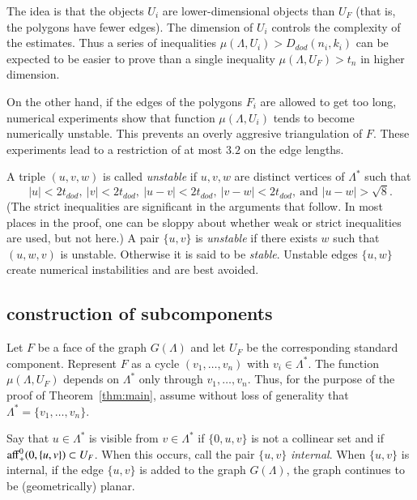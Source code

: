 The idea is that the objects $U_i$ are lower-dimensional objects
than $U_F$ (that is, the polygons  have fewer edges).
The dimension of $U_i$ controls the complexity
of the estimates.  Thus a series of inequalities $\mu(\Lambda,U_i) > D_{dod}(n_i,k_i)$
can be expected to be easier to prove than a single inequality
$\mu(\Lambda,U_F) > t_n$ in higher dimension.  

On the other hand, if the edges of the polygons $F_i$ are allowed
to get too long, numerical experiments show that function $\mu(\Lambda,U_i)$
tends to become numerically unstable.  This prevents 
an overly aggresive  triangulation of $F$.
These experiments lead
 to a restriction of at most $3.2$ on the edge lengths.

A triple $(u,v,w)$ is called {\it unstable}
if $u,v,w$ are distinct vertices of $\Lambda^*$ such
that 
$$
|u| < 2t_{dod},\ |v| < 2 t_{dod},\ |u-v|< 2t_{dod},\  |v-w|< 2t_{dod},\ \text{and } |u-w|>\sqrt8.$$  
(The 
strict inequalities are significant in the arguments that follow.
In most places in the proof, one can be sloppy about whether
weak or strict inequalities are used, but not here.)
A pair $\{u,v\}$ is {\it unstable} if there exists $w$ such that $(u,w,v)$
is unstable.  Otherwise it is said to be {\it stable}.
Unstable edges $\{u,w\}$ create
 numerical instabilities and are best avoided.


\subsection{construction of subcomponents}

Let $F$ be a face of the graph $G(\Lambda)$ and let $U_F$ be the
corresponding standard component.  Represent $F$ as a cycle
$(v_1,\ldots,v_n)$ with $v_i\in\Lambda^*$.  The function
$\mu(\Lambda,U_F)$ depends  on $\Lambda^*$ only through
$v_1,\ldots,v_n$.  Thus, for the purpose of the proof of
Theorem~\ref{thm:main},  assume without loss of generality
that $\Lambda^* = \{v_1,\ldots,v_n\}$.

Say that $u\in\Lambda^*$ is visible from $v\in\Lambda^*$ if
$\{0,u,v\}$ is not a collinear set and if
${\operatorname{aff}}_+^0(0,\{u,v\})\subset U_F$.  When this occurs, 
call the pair $\{u,v\}$ {\it internal}.  When $\{u,v\}$
is  internal, if the edge $\{u,v\}$ is added to the
graph $G(\Lambda)$, the graph continues to be (geometrically) planar.




